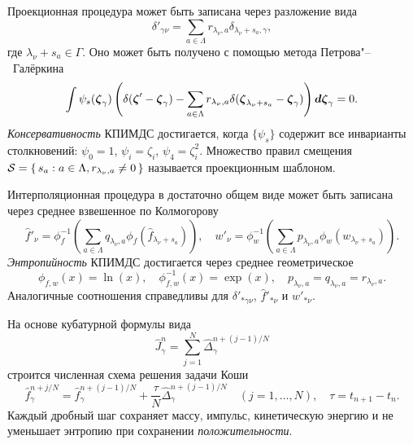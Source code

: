 Проекционная процедура может быть записана через разложение вида
\begin{equation*}
    \delta'_{\gamma\nu} = \sum_{a\in\Lambda} r_{\lambda_\nu,a}\delta_{\lambda_\nu+s_a,\gamma},
\end{equation*}
где \(\lambda_\nu+s_a\in\Gamma\). Оно может быть получено с помощью метода Петрова"--~Галёркина
\begin{equation*}
    \int \psi_s({\boldsymbol{\zeta}}_\gamma) \left(
        \delta({\boldsymbol{\zeta}}'-{\boldsymbol{\zeta}}_\gamma)
        - \sum_{a\in\Lambda} r_{\lambda_\nu,a} \delta({\boldsymbol{\zeta}}_{\lambda_\nu+s_a}-{\boldsymbol{\zeta}}_\gamma)
    \right) \boldsymbol{d\zeta}_\gamma = 0.
\end{equation*}
\emph{Консервативность} КПИМДС достигается, когда \(\{\psi_s\}\) содержит все инварианты столкновений:
\(\psi_0 = 1\), \(\psi_i = \zeta_i\), \(\psi_4 = \zeta_i^2\).
Множество правил смещения \(\mathcal{S} = \{\,{s_a}:{a\in\Lambda, r_{\lambda_\nu,a}\neq0}\,\}\) называется проекционным шаблоном.

Интерполяционная процедура в достаточно общем виде может быть записана через среднее взвешенное по Колмогорову
\begin{equation*}
    \hat{f}'_{\nu} = \phi^{-1}_f\left(\sum_{a\in\Lambda} q_{\lambda_\nu,a}
        \phi_f\left(\hat{f}_{\lambda_\nu+s_a}\right)\right), \quad
    w'_{\nu} = \phi^{-1}_w\left(\sum_{a\in\Lambda} p_{\lambda_\nu,a}
        \phi_w\left(w_{\lambda_\nu+s_a}\right)\right).
\end{equation*}
\emph{Энтропийность} КПИМДС достигается через среднее геометрическое
\begin{equation*}
   \phi_{f,w}(x) = \ln(x), \quad \phi_{f,w}^{-1}(x) = \exp(x), \quad p_{\lambda_\nu,a} = q_{\lambda_\nu,a} = r_{\lambda_\nu,a}.
\end{equation*}
Аналогичные соотношения справедливы для \(\delta'_{*\gamma\nu}\), \(\hat{f}'_{*\nu}\) и \(w'_{*\nu}\).

На основе кубатурной формулы вида
\begin{equation*}
    \hat{J}_\gamma^n = \sum_{j=1}^N \hat{\Delta}_{\gamma}^{n+(j-1)/N}
\end{equation*}
строится численная схема решения задачи Коши
\begin{equation*}
    \hat{f}_\gamma^{n+j/N} = \hat{f}_\gamma^{n+(j-1)/N} + \frac{\tau}{N}\hat{\Delta}_{\gamma}^{n+(j-1)/N}
    \quad (j = 1,\dotsc,N), \quad \tau = t_{n+1}-t_n.
\end{equation*}
Каждый дробный шаг сохраняет массу, импульс, кинетическую энергию и не уменьшает энтропию
при сохранении \emph{положительности}.

